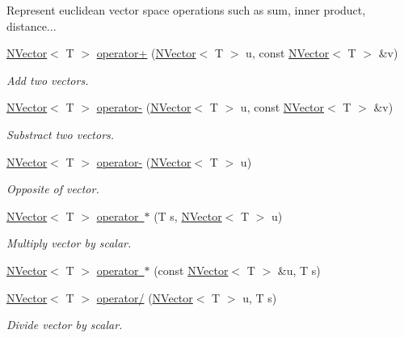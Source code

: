\begin{Indent}
{Represent euclidean vector space operations such as sum, inner product, distance... }\begin{DoxyCompactItemize}
\item 
\mbox{\hyperlink{class_n_vector}{N\+Vector}}$<$ T $>$ \mbox{\hyperlink{class_n_vector_a302d1dc15ce109264b050fb074518981}{operator+}} (\mbox{\hyperlink{class_n_vector}{N\+Vector}}$<$ T $>$ u, const \mbox{\hyperlink{class_n_vector}{N\+Vector}}$<$ T $>$ \&v)
\begin{DoxyCompactList}\small\item\em Add two vectors. \end{DoxyCompactList}\item 
\mbox{\hyperlink{class_n_vector}{N\+Vector}}$<$ T $>$ \mbox{\hyperlink{class_n_vector_a870ba98635d7984c826f2d1f60d8b4e3}{operator-\/}} (\mbox{\hyperlink{class_n_vector}{N\+Vector}}$<$ T $>$ u, const \mbox{\hyperlink{class_n_vector}{N\+Vector}}$<$ T $>$ \&v)
\begin{DoxyCompactList}\small\item\em Substract two vectors. \end{DoxyCompactList}\item 
\mbox{\hyperlink{class_n_vector}{N\+Vector}}$<$ T $>$ \mbox{\hyperlink{class_n_vector_a3991d193c344ff47ee71380879b7b2a2}{operator-\/}} (\mbox{\hyperlink{class_n_vector}{N\+Vector}}$<$ T $>$ u)
\begin{DoxyCompactList}\small\item\em Opposite of vector. \end{DoxyCompactList}\item 
\mbox{\hyperlink{class_n_vector}{N\+Vector}}$<$ T $>$ \mbox{\hyperlink{class_n_vector_aee06ce5bbd64e05216ebdf521d77aa35}{operator $\ast$}} (T s, \mbox{\hyperlink{class_n_vector}{N\+Vector}}$<$ T $>$ u)
\begin{DoxyCompactList}\small\item\em Multiply vector by scalar. \end{DoxyCompactList}\item 
\mbox{\hyperlink{class_n_vector}{N\+Vector}}$<$ T $>$ \mbox{\hyperlink{class_n_vector_ab1ec596666b587300410f8fa459f295d}{operator $\ast$}} (const \mbox{\hyperlink{class_n_vector}{N\+Vector}}$<$ T $>$ \&u, T s)
\item 
\mbox{\hyperlink{class_n_vector}{N\+Vector}}$<$ T $>$ \mbox{\hyperlink{class_n_vector_a56643335b5a0b0b07abe89e2cac8a5de}{operator/}} (\mbox{\hyperlink{class_n_vector}{N\+Vector}}$<$ T $>$ u, T s)
\begin{DoxyCompactList}\small\item\em Divide vector by scalar. \end{DoxyCompactList}\item 

\end{DoxyCompactItemize}
\end{Indent}
